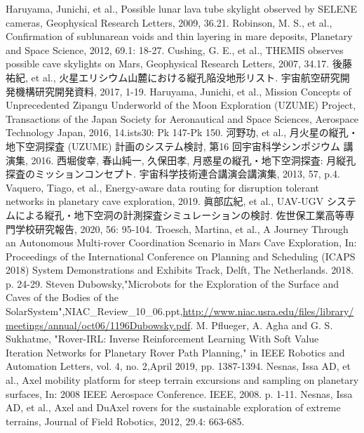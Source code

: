 \documentclass[a4paper,11pt,dvipdfmx.uplatex]{jsarticle}
\begin{document}
\begin{thebibliography}{99}
Haruyama, Junichi, et al., Possible lunar lava tube skylight observed by SELENE cameras, Geophysical Research Letters, 2009, 36.21.
Robinson, M. S., et al., Confirmation of sublunarean voids and thin layering in mare deposits, Planetary and Space Science, 2012, 69.1: 18-27.
Cushing, G. E., et al., THEMIS observes possible cave skylights on Mars, Geophysical Research Letters, 2007, 34.17.
後藤祐紀, et al., 火星エリシウム山麓における縦孔陥没地形リスト. 宇宙航空研究開発機構研究開発資料, 2017, 1-19.
 Haruyama, Junichi, et al., Mission Concepts of Unprecedented Zipangu Underworld of the Moon Exploration (UZUME) Project, Transactions of the Japan Society for Aeronautical and Space Sciences, Aerospace Technology Japan, 2016, 14.ists30: Pk 147-Pk 150.
河野功, et al., 月火星の縦孔・地下空洞探査 (UZUME) 計画のシステム検討, 第16 回宇宙科学シンポジウム 講演集, 2016.
西堀俊幸, 春山純一, 久保田孝, 月惑星の縦孔・地下空洞探査: 月縦孔探査のミッションコンセプト. 宇宙科学技術連合講演会講演集, 2013, 57, p.4.
 Vaquero, Tiago, et al., Energy-aware data routing for disruption tolerant networks in planetary cave exploration, 2019.
 眞部広紀, et al., UAV-UGV システムによる縦孔・地下空洞の計測探査シミュレーションの検討. 佐世保工業高等専門学校研究報告, 2020, 56: 95-104.
Troesch, Martina, et al., A Journey Through an Autonomous Multi-rover Coordination Scenario in Mars Cave Exploration, In: Proceedings of the International Conference on Planning and Scheduling (ICAPS 2018) System Demonstrations and Exhibits Track, Delft, The Netherlands. 2018. p. 24-29.
Steven Dubowsky,"Microbots for the Exploration of the Surface and Caves of the Bodies of the SolarSystem",NIAC\_Review\_10\_06.ppt,\url{http://www.niac.usra.edu/files/library/meetings/annual/oct06/1196Dubowsky.pdf}.
M. Pflueger, A. Agha and G. S. Sukhatme, "Rover-IRL: Inverse Reinforcement Learning With Soft Value Iteration Networks for Planetary Rover Path Planning," in IEEE Robotics and Automation Letters, vol. 4, no. 2,April 2019, pp. 1387-1394.
Nesnas, Issa AD, et al., Axel mobility platform for steep terrain excursions and sampling on planetary surfaces, In: 2008 IEEE Aerospace Conference. IEEE, 2008. p. 1-11.
Nesnas, Issa AD, et al., Axel and DuAxel rovers for the sustainable exploration of extreme terrains, Journal of Field Robotics, 2012, 29.4: 663-685.

\end{thebibliography}
\end{document}
